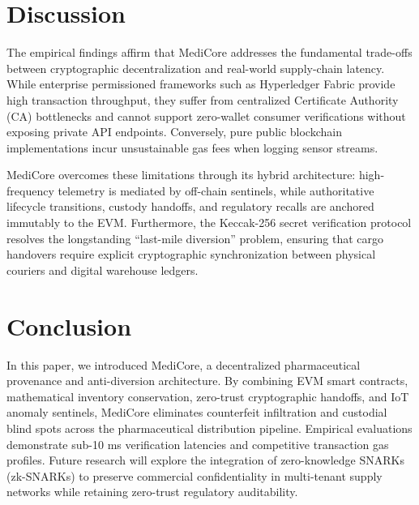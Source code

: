 \documentclass[11pt,a4paper]{article}
\begin{document}
\section{Discussion}
The empirical findings affirm that MediCore addresses the fundamental trade-offs between cryptographic decentralization and real-world supply-chain latency. While enterprise permissioned frameworks such as Hyperledger Fabric provide high transaction throughput, they suffer from centralized Certificate Authority (CA) bottlenecks and cannot support zero-wallet consumer verifications without exposing private API endpoints. Conversely, pure public blockchain implementations incur unsustainable gas fees when logging sensor streams.

MediCore overcomes these limitations through its hybrid architecture: high-frequency telemetry is mediated by off-chain sentinels, while authoritative lifecycle transitions, custody handoffs, and regulatory recalls are anchored immutably to the EVM. Furthermore, the Keccak-256 secret verification protocol resolves the longstanding ``last-mile diversion'' problem, ensuring that cargo handovers require explicit cryptographic synchronization between physical couriers and digital warehouse ledgers.

\section{Conclusion}
In this paper, we introduced MediCore, a decentralized pharmaceutical provenance and anti-diversion architecture. By combining EVM smart contracts, mathematical inventory conservation, zero-trust cryptographic handoffs, and IoT anomaly sentinels, MediCore eliminates counterfeit infiltration and custodial blind spots across the pharmaceutical distribution pipeline. Empirical evaluations demonstrate sub-10 ms verification latencies and competitive transaction gas profiles. Future research will explore the integration of zero-knowledge SNARKs (zk-SNARKs) to preserve commercial confidentiality in multi-tenant supply networks while retaining zero-trust regulatory auditability.

\end{document}
